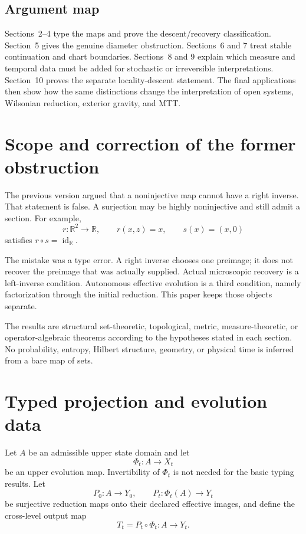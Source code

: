 \documentclass[11pt]{article}
\begin{document}
\subsection{Argument map}

Sections~2--4 type the maps and prove the descent/recovery classification.
Section~5 gives the genuine diameter obstruction.  Sections~6 and 7 treat
stable continuation and chart boundaries.  Sections~8 and 9 explain which
measure and temporal data must be added for stochastic or irreversible
interpretations.  Section~10 proves the separate locality-descent statement.
The final
applications then show how the same distinctions change the interpretation of
open systems, Wilsonian reduction, exterior gravity, and MTT.

\section{Scope and correction of the former obstruction}

The previous version argued that a noninjective map cannot have a right
inverse. That statement is false. A surjection may be highly noninjective and
still admit a section. For example,
\[
 r:\mathbb R^2\to\mathbb R,\qquad r(x,z)=x,
 \qquad s(x)=(x,0)
\]
satisfies $r\circ s=\operatorname{id}_{\mathbb R}$.

The mistake was a type error. A right inverse chooses one preimage; it does not
recover the preimage that was actually supplied. Actual microscopic recovery
is a left-inverse condition. Autonomous effective evolution is a third
condition, namely factorization through the initial reduction. This paper
keeps those objects separate.

The results are structural set-theoretic, topological, metric,
measure-theoretic, or operator-algebraic theorems according to the hypotheses
stated in each section. No probability, entropy, Hilbert structure, geometry,
or physical time is inferred from a bare map of sets.

\section{Typed projection and evolution data}

Let $A$ be an admissible upper state domain and let
\[
 \Phi_t:A\to X_t
\]
be an upper evolution map. Invertibility of $\Phi_t$ is not needed for the
basic typing results. Let
\[
 P_0:A\to Y_0,
 \qquad
 P_t:\Phi_t(A)\to Y_t
\]
be surjective reduction maps onto their declared effective images, and define
the cross-level output map
\[
 T_t=P_t\circ\Phi_t:A\to Y_t.
\]
\end{document}
